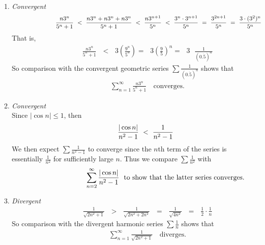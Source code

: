 \documentclass[12pt]{amsart}
\begin{document}
\begin{enumerate}
\begin{enumerate}
			\item  \emph{Convergent}
				\begin{eqnarray}
					\hspace{2.5cm} \frac{n3^n}{5^n+1} \text{ } < \text{ }\frac{n3^n+n3^n+n3^n}{5^n+1} 
					\text{ } < \text{ } \frac{n3^{n+1}}{5^n} \text{ } < \text{ } \frac{3^n \cdot 3^{n+1}}{5^n} 
					\text{ } = \text{ } \frac{3^{2n+1}}{5^n} \text{ } = \text{ } \frac{3 \cdot (3^2)^n}{5^n}							\nonumber
				\end{eqnarray}
			That is, 
				\begin{eqnarray}
					\hspace{2cm}\frac{n3^n}{5^n+1} \text{ } < \text{ }3 \left(\frac{9^n}{5^n}\right) = \text{ } 						3 \left(\frac{9}{5}\right)^n =  \text{ } 3 \text{ } \frac{1}{(0.\dot{ 5})^n} \nonumber
				\end{eqnarray}
			So comparison with the convergent geometric series $\sum \frac{1}{(0.\dot{ 5})^n}$ shows that
				\begin{eqnarray}
					\hspace{2cm} \sum^\infty_{n=1} \frac{n3^n}{5^n+1} \text{ } \text{ converges.} 							\nonumber
				\end{eqnarray}							
			\item \emph{Convergent} \\
			Since $|\cos n| \le 1$, then 
				\begin{eqnarray}
					\hspace{1.5cm} \frac{|\cos n|}{n^2-1} \text{ } < \text{ } \frac{1}{n^2-1} \nonumber
				\end{eqnarray}
			We then expect $\sum \frac{1}{n^2-1}$ to converge since the $n$th term of the series is 					essentially $\frac{1}{n^2}$ for sufficiently large $n$. Thus we compare $\sum \frac{1}{n^2}$ 				with  
				\begin{eqnarray}
					\hspace{3.5cm} \sum^\infty_{n=2} \frac{|\cos n|}{n^2-1} \text{ } \text{ to show that the 						latter series converges.} \nonumber
				\end{eqnarray}	
				
			\item	\emph{Divergent}
				\begin{eqnarray}
					\hspace{2cm}\frac{1}{\sqrt{2n^2+1}} \text{ } > \text{ } \frac{1}{\sqrt{2n^2+2n^2}} \text{ }
					= \text{ } \frac{1}{\sqrt{4n^2}} \text{ } = \text{ } \frac{1}{2} \cdot \frac{1}{n} \nonumber
				\end{eqnarray}
			So comparison with the divergent harmonic series $\sum \frac{1}{n}$ shows that
				\begin{eqnarray}
					\hspace{2cm} \sum^\infty_{n=1} \frac{1}{\sqrt{2n^2+1}} \text{ } \text{ diverges.} 							\nonumber
				\end{eqnarray}
				

\end{enumerate}
\end{enumerate}
\end{document}
